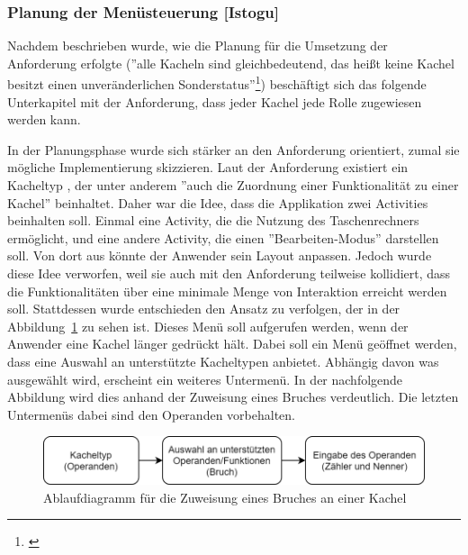 
\clearpage

\subsubsection{Planung der Menüsteuerung [Istogu]}

Nachdem beschrieben wurde, wie die Planung für die Umsetzung der Anforderung erfolgte (''alle Kacheln sind gleichbedeutend, das heißt keine Kachel besitzt einen unveränderlichen Sonderstatus''\footnote{\cite[vgl.][]{seifert2020a}}) beschäftigt sich das folgende Unterkapitel mit der Anforderung, dass jeder Kachel jede Rolle zugewiesen werden kann.

In der Planungsphase wurde sich stärker an den Anforderung orientiert, zumal sie mögliche Implementierung skizzieren. Laut der Anforderung existiert ein Kacheltyp , der unter anderem ''auch die Zuordnung einer Funktionalität zu einer Kachel'' beinhaltet. Daher war die Idee, dass die Applikation zwei Activities beinhalten soll. Einmal eine Activity, die die Nutzung des Taschenrechners ermöglicht, und eine andere Activity, die einen ''Bearbeiten-Modus'' darstellen soll. Von dort aus könnte der Anwender sein Layout anpassen. Jedoch wurde diese Idee verworfen, weil sie auch mit den Anforderung teilweise kollidiert, dass die Funktionalitäten über eine minimale Menge von Interaktion erreicht werden soll. Stattdessen wurde entschieden den Ansatz zu verfolgen, der in der Abbildung~\ref{fig:ablaufdiagramm-fuer-zuweisung} zu sehen ist. Dieses Menü soll aufgerufen werden, wenn der Anwender eine Kachel länger gedrückt hält. 
Dabei soll ein Menü geöffnet werden, dass eine Auswahl an unterstützte Kacheltypen anbietet. Abhängig davon was ausgewählt wird, erscheint ein weiteres Untermenü. In der nachfolgende Abbildung wird dies anhand der Zuweisung eines Bruches verdeutlich. Die letzten Untermenüs dabei sind den Operanden vorbehalten.
 

\begin{figure}[!h]
	\includegraphics[width=1\columnwidth]{img/ablaufdiagramm-fuer-zuweisung}
	\caption[Ablaufdiagramm für die Zuweisung eines Bruches an einer Kachel]{Ablaufdiagramm für die Zuweisung eines Bruches an einer Kachel\footnotemark}
	\label{fig:ablaufdiagramm-fuer-zuweisung}
\end{figure}

